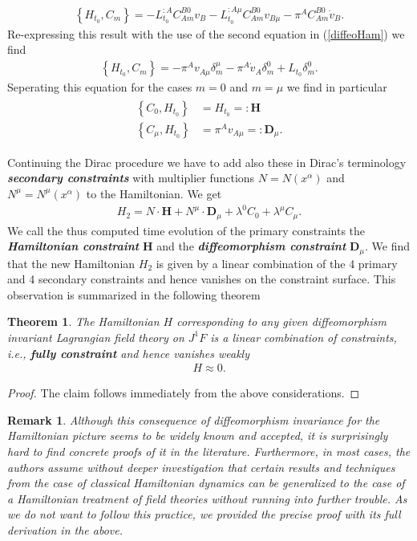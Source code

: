 \documentclass[a4paper,12pt, DIV=14, BCOR=5mm, twoside, headsepline, numbers=noenddot]{scrbook}
\newtheorem{theorem}{Theorem}[section]
\newtheorem*{remark}{Remark}
\begin{document}
\begin{align}
    \left \{H_{t_0}, C_m \right \} = -L_{t_0}^{:A} C_{Am}^{B0} v_B - L_{t_0}^{:A\mu} C_{Am}^{B0}v_{B \mu} - \pi^A C_{Am}^{B0} \dot{v}_B.
\end{align}
Re-expressing this result with the use of the second equation in (\ref{diffeoHam}) we find 
\begin{align}
    \left \{H_{t_0}, C_m \right \} = -\pi^A v_{A\mu} \delta^{\mu}_m - \pi^A \dot{v}_A \delta^0_m + L_{t_0}\delta^0_m.
\end{align}
Seperating this equation for the cases $m=0$ and $m = \mu$ we find in particular
\begin{align}
\begin{aligned}
    \left \{C_0 , H_{t_0}\right \} &= H_{t_0} =: \mathbf{H} \\
    \left \{C_{\mu} , H_{t_0}\right \} &= \pi^A v_{A\mu} =: \mathbf{D}_{\mu}.
\end{aligned}
\end{align}

Continuing the Dirac procedure we have to add also these in Dirac's terminology \textit{\textbf{secondary constraints}} with multiplier functions $N=N(x^{\alpha})$ and $N^{\mu}= N^{\mu}(x^{\alpha})$ to the Hamiltonian. We get
\begin{align}
H_{2} = N \cdot \mathbf{H} + N^{\mu} \cdot \mathbf{D}_{\mu} + \lambda^0 C_0 + \lambda^{\mu}C_{\mu}.
\end{align}
We call the thus computed time evolution of the primary constraints the \textit{\textbf{Hamiltonian constraint}} $\mathbf{H}$ and the \textit{\textbf{diffeomorphism constraint}} $\mathbf{D}_{\mu}$.
We find that the new Hamiltonian $H_{2}$ is given by a linear combination of the 4 primary and 4 secondary constraints and hence vanishes on the constraint surface. This observation is summarized in the following theorem
\begin{theorem}
The Hamiltonian $H$ corresponding to any given diffeomorphism invariant Lagrangian field theory on $J^1F$ is a linear combination of constraints, i.e., \textbf{\textit{fully constraint}} and hence vanishes weakly
\begin{align}
   H \approx 0.
\end{align}
\end{theorem}
\begin{proof}
The claim follows immediately from the above considerations.
\end{proof}
\begin{remark}
Although this consequence of diffeomorphism invariance for the Hamiltonian picture seems to be widely known and accepted, it is surprisingly hard to find concrete proofs of it in the literature. Furthermore, in most cases, the authors assume without deeper investigation that certain results and techniques from the case of classical Hamiltonian dynamics can be generalized to the case of a Hamiltonian treatment of field theories without running into further trouble. As we do not want to follow this practice, we provided the precise proof with its full derivation in the above.
\end{remark}
\end{document}
